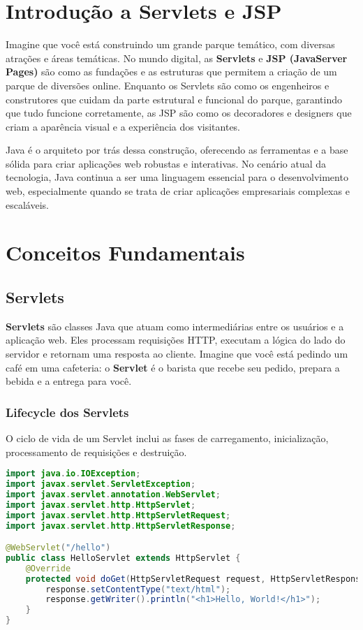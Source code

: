 \documentclass[a4paper,12pt]{book}
\begin{document}
\section{Introdução a Servlets e JSP}

Imagine que você está construindo um grande parque temático, com diversas atrações e áreas temáticas. No mundo digital, as \textbf{Servlets} e \textbf{JSP (JavaServer Pages)} são como as fundações e as estruturas que permitem a criação de um parque de diversões online. Enquanto os Servlets são como os engenheiros e construtores que cuidam da parte estrutural e funcional do parque, garantindo que tudo funcione corretamente, as JSP são como os decoradores e designers que criam a aparência visual e a experiência dos visitantes.

Java é o arquiteto por trás dessa construção, oferecendo as ferramentas e a base sólida para criar aplicações web robustas e interativas. No cenário atual da tecnologia, Java continua a ser uma linguagem essencial para o desenvolvimento web, especialmente quando se trata de criar aplicações empresariais complexas e escaláveis.

\section{Conceitos Fundamentais}

\subsection{Servlets}
\textbf{Servlets} são classes Java que atuam como intermediárias entre os usuários e a aplicação web. Eles processam requisições HTTP, executam a lógica do lado do servidor e retornam uma resposta ao cliente. Imagine que você está pedindo um café em uma cafeteria: o \textbf{Servlet} é o barista que recebe seu pedido, prepara a bebida e a entrega para você.

\subsubsection{Lifecycle dos Servlets}
O ciclo de vida de um Servlet inclui as fases de carregamento, inicialização, processamento de requisições e destruição.

\begin{lstlisting}[language=java,caption={Exemplo de Servlet}]
import java.io.IOException;
import javax.servlet.ServletException;
import javax.servlet.annotation.WebServlet;
import javax.servlet.http.HttpServlet;
import javax.servlet.http.HttpServletRequest;
import javax.servlet.http.HttpServletResponse;

@WebServlet("/hello")
public class HelloServlet extends HttpServlet {
    @Override
    protected void doGet(HttpServletRequest request, HttpServletResponse response) throws ServletException, IOException {
        response.setContentType("text/html");
        response.getWriter().println("<h1>Hello, World!</h1>");
    }
}
\end{lstlisting}
\end{document}
